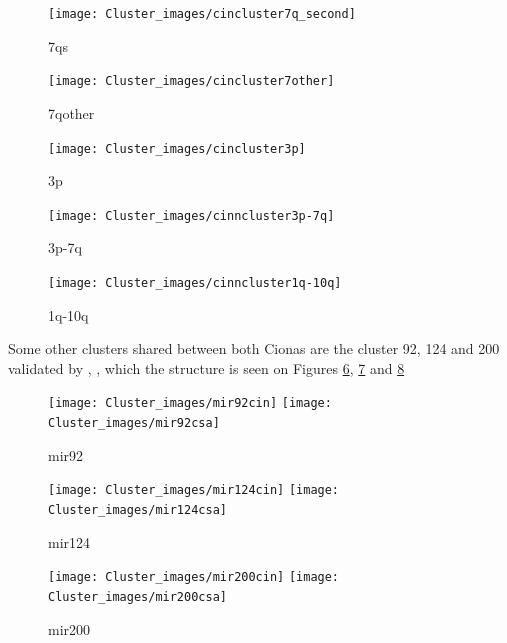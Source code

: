 \documentclass[11pt]{article}
\begin{document}
\newpage

\begin{figure}[htb!]
\centering
\texttt{[image: Cluster\_images/cincluster7q\_second]} 
\caption{7qs}
\label{7qs}
\end{figure}

\begin{figure}[htb!]
\centering
\texttt{[image: Cluster\_images/cincluster7other]} 
\caption{7qother}
\label{7qother}
\end{figure}


\begin{figure}[htb!]
\centering
\texttt{[image: Cluster\_images/cincluster3p]} 
\caption{3p}
\label{3p}
\end{figure}


\begin{figure}[htb!]
\centering
\texttt{[image: Cluster\_images/cinncluster3p-7q]} 
\caption{3p-7q}
\label{3p-7q}
\end{figure}



\begin{figure}[htb!]
\centering
\texttt{[image: Cluster\_images/cinncluster1q-10q]} 
\caption{1q-10q}
\label{1q-10q}
\end{figure}



Some other clusters shared between both Cionas are the cluster 92, 124 and 200  validated by \cite{Norden-Krichmar2007}, \cite{Fu2008}, \cite{Hendrix2010} which the structure is seen on Figures \ref{mir92}, \ref{mir124} and \ref{mir200}    

\begin{figure}[htb!]
\centering
\texttt{[image: Cluster\_images/mir92cin]} \quad \texttt{[image: Cluster\_images/mir92csa]} 
\caption{mir92}
\label{mir92}
\end{figure}

\begin{figure}[htb!]
\centering
\texttt{[image: Cluster\_images/mir124cin]} \quad \texttt{[image: Cluster\_images/mir124csa]} 
\caption{mir124}
\label{mir124}
\end{figure}

\begin{figure}[htb!]
\centering
\texttt{[image: Cluster\_images/mir200cin]} \quad \texttt{[image: Cluster\_images/mir200csa]} 
\caption{mir200}
\label{mir200}

\end{figure}
\end{document}
